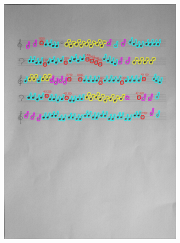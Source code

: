\documentclass[11pt]{article}
\begin{document}
\begin{figure}[H]
    \centering
    \begin{subfigure}{.5\textwidth}
        \centering
        \graphicspath{ {blobs/} }
        \includegraphics[width=\linewidth]{13_cnts.jpg}
        \label{fig:sub1}
    \end{subfigure}%
    \begin{subfigure}{.5\textwidth}
        \centering
        \graphicspath{ {blobs/} }

\end{subfigure}
\end{figure}
\end{document}
